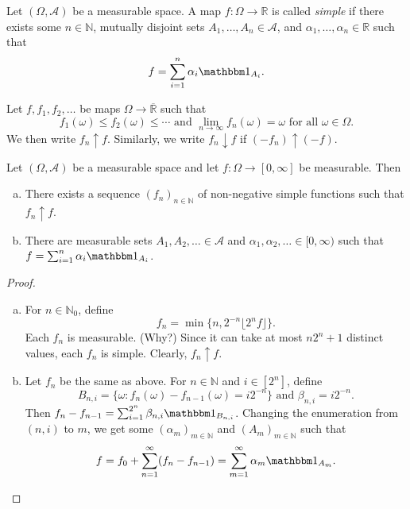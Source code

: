 \begin{definition}
    Let $(\Omega,\mathcal{A})$ be a measurable space. A map $f:\Omega\to\mathbb{R}$ is called \textit{simple} if there exists some $n\in\mathbb{N}$, mutually disjoint sets $A_1,\ldots,A_n\in\mathcal{A}$, and $\alpha_1,\ldots,\alpha_n\in\mathbb{R}$ such that
    $$f=\sum_{i=1}^n \alpha_i\indic_{A_i}.$$
\end{definition}

\begin{definition}
    Let $f,f_1,f_2,\ldots$ be maps $\Omega\to\overline{\mathbb{R}}$ such that
    $$f_1(\omega)\leq f_2(\omega)\leq\cdots\text{ and }\lim_{n\to\infty}f_n(\omega)=\omega\text{ for all }\omega\in\Omega.$$
    We then write $f_n\uparrow f$. Similarly, we write $f_n\downarrow f$ if $(-f_n)\uparrow(-f)$.
\end{definition}

\begin{theorem}
\label{measurable function simple sequence}
    Let $(\Omega,\mathcal{A})$ be a measurable space and let $f:\Omega\to[0,\infty]$ be measurable. Then
    \begin{enumerate}[(a)]
        \item There exists a sequence $(f_n)_{n\in\mathbb{N}}$ of non-negative simple functions such that $f_n\uparrow f$.
        \item There are measurable sets $A_1,A_2,\ldots\in\mathcal{A}$ and $\alpha_1,\alpha_2,\ldots\in[0,\infty)$ such that $f=\sum_{i=1}^n \alpha_i\indic_{A_i}$.
    \end{enumerate}
\end{theorem}
\begin{proof}
    ~
    \begin{enumerate}[(a)]
        \item For $n\in\mathbb{N}_0$, define
        $$f_n=\min\{n, 2^{-n}\lfloor2^nf\rfloor\}.$$
        Each $f_n$ is measurable. (Why?) Since it can take at most $n2^n+1$ distinct values, each $f_n$ is simple. Clearly, $f_n\uparrow f$.
        
        \item Let $f_n$ be the same as above. For $n\in\mathbb{N}$ and $i\in[2^n]$, define
        $$B_{n,i}=\{\omega:f_n(\omega)-f_{n-1}(\omega)=i2^{-n}\}\text{ and }\beta_{n,i}=i2^{-n}.$$
        Then $f_n-f_{n-1}=\sum_{i=1}^{2^n} \beta_{n,i}\indic_{B_{n,i}}$. Changing the enumeration from $(n,i)$ to $m$, we get some $(\alpha_m)_{m\in\mathbb{N}}$ and $(A_m)_{m\in\mathbb{N}}$ such that
        $$f=f_0 + \sum_{n=1}^\infty(f_n-f_{n-1})=\sum_{m=1}^\infty \alpha_m\indic_{A_m}.$$
    \end{enumerate}
\end{proof}

